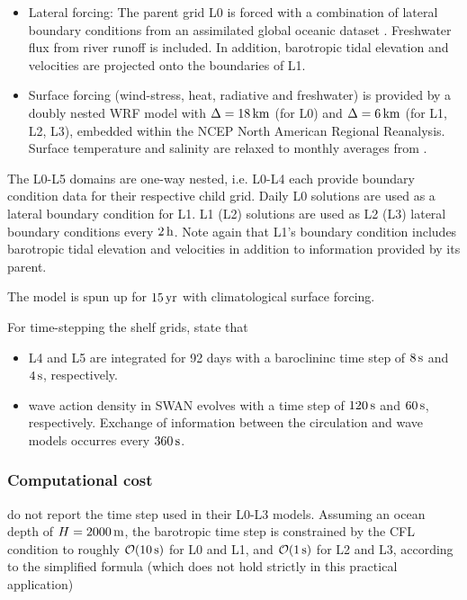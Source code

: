 \documentclass[12pt,a4paper]{article}
\begin{document}
\begin{itemize}
	\item Lateral forcing: The parent grid L0 is forced with a combination of lateral boundary conditions from an assimilated global oceanic dataset \citep{carton2008reanalysis}. Freshwater flux from river runoff is included. In addition, barotropic tidal elevation and velocities are projected onto the boundaries of L1.
	
	\item Surface forcing (wind-stress, heat, radiative and freshwater) is provided by a doubly nested WRF model with $\Delta=18\,\rm km$ (for L0) and $\Delta=6\,\rm km$ (for L1, L2, L3), embedded within the NCEP North American Regional Reanalysis. Surface temperature and salinity are relaxed to monthly averages from \cite{carton2008reanalysis}.
	
\end{itemize}

The L0-L5 domains are one-way nested, i.e. L0-L4 each provide boundary condition data for their respective child grid. Daily L0 solutions are used as a lateral boundary condition for L1. L1 (L2) solutions are used as L2 (L3) lateral boundary conditions every $2\,\rm h$. Note again that L1's boundary condition includes barotropic tidal elevation and velocities in addition to information provided by its parent.

The model is spun up for $15\,\rm yr$ with climatological surface forcing.


For time-stepping the shelf grids, \cite{kumar2015midshelf} state that

\begin{itemize}
	\item L4 and L5 are integrated for 92 days with a baroclininc time step of $8\,\rm s$ and $4\,\rm s$, respectively.
	\item wave action density in SWAN evolves with a time step of $120\,\rm s$ and $60\,\rm s$, respectively. Exchange of information between the circulation and wave models occurres every $360\,\rm s$.
\end{itemize}


\subsubsection{Computational cost}

\cite{kumar2015midshelf} do not report the time step used in their L0-L3 models. Assuming an ocean depth of $H=2000\,\rm m$, the barotropic time step is constrained by the CFL condition to roughly $\mathcal{O}(10\,\rm s)$ for L0 and L1, and $\mathcal{O}(1\,\rm s)$ for L2 and L3, according to the simplified formula (which does not hold strictly in this practical application)
\end{document}
